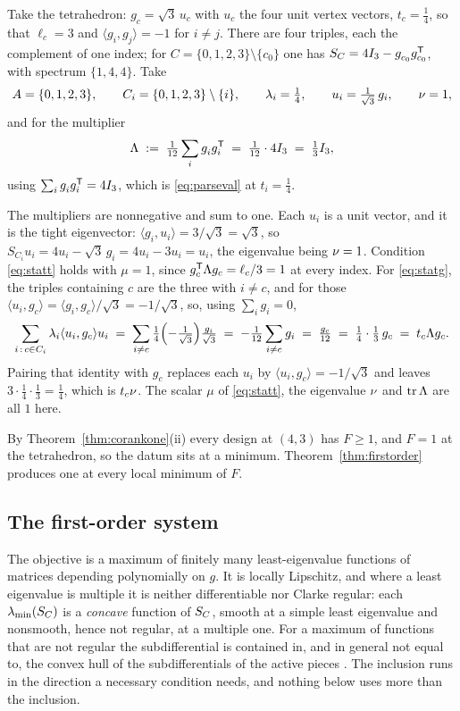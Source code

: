 \begin{example}\label{ex:tetrakkt}
Take the tetrahedron: $g_c=\sqrt3\,u_c$ with $u_c$ the four unit vertex
vectors, $t_c=\tfrac14$, so that $\ell_c=3$ and
$\langle g_i,g_j\rangle=-1$ for $i\ne j$.  There are four triples, each
the complement of one index; for $C=\{0,1,2,3\}\setminus\{c_0\}$ one has
$\SC=4I_3-g_{c_0}^{\vphantom{\mathsf{T}}}g_{c_0}\tp$, with spectrum $\{1,4,4\}$.
Take
\[
  A=\{0,1,2,3\},\qquad C_i=\{0,1,2,3\}\setminus\{i\},\qquad
  \lambda_i=\tfrac14,\qquad
  u_i=\tfrac{1}{\sqrt3}\,g_i,\qquad \nu=1 ,
\]
and for the multiplier
\[
  \Lambda\;:=\;\tfrac1{12}\sum_ig_i^{\vphantom{\mathsf{T}}}g_i\tp
  \;=\;\tfrac1{12}\cdot4I_3\;=\;\tfrac13I_3 ,
\]
using $\sum_ig_i^{\vphantom{\mathsf{T}}}g_i\tp=4I_3$, which is
\eqref{eq:parseval} at $t_i=\tfrac14$.

The multipliers are nonnegative and sum to one.  Each $u_i$ is a unit
vector, and it is the tight eigenvector:
$\langle g_i,u_i\rangle=3/\sqrt3=\sqrt3$, so
$S_{C_i}u_i=4u_i-\sqrt3\,g_i=4u_i-3u_i=u_i$, the eigenvalue being
$\nu=1$.  Condition \eqref{eq:statt} holds with $\mu=1$, since
$g_c^{\mathsf{T}}\Lambda g_c=\ell_c/3=1$ at every index.  For \eqref{eq:statg}, the
triples containing $c$ are the three with $i\ne c$, and for those
$\langle u_i,g_c\rangle=\langle g_i,g_c\rangle/\sqrt3=-1/\sqrt3$, so,
using $\sum_ig_i=0$,
\[
  \sum_{i\,:\,c\in C_i}\lambda_i\langle u_i,g_c\rangle u_i
  \;=\;\sum_{i\ne c}\tfrac14\Bigl(-\tfrac1{\sqrt3}\Bigr)
       \tfrac{g_i}{\sqrt3}
  \;=\;-\tfrac1{12}\sum_{i\ne c}g_i
  \;=\;\tfrac{g_c}{12}
  \;=\;\tfrac14\cdot\tfrac13\,g_c
  \;=\;t_c\Lambda g_c .
\]
Pairing that identity with $g_c$ replaces each $u_i$ by
$\langle u_i,g_c\rangle=-1/\sqrt3$ and leaves
$3\cdot\tfrac14\cdot\tfrac13=\tfrac14$, which is $t_c\nu$.  The scalar
$\mu$ of \eqref{eq:statt}, the eigenvalue $\nu$ and $\operatorname{tr}\Lambda$ are all
$1$ here.
\end{example}

By Theorem~\ref{thm:corankone}(ii) every design at $(4,3)$ has $F\ge1$,
and $F=1$ at the tetrahedron, so the datum sits at a minimum.
Theorem~\ref{thm:firstorder} produces one at every local minimum of $F$.

\subsection{The first-order system}\label{sec:kkt}

The objective is a maximum of finitely many least-eigenvalue functions of
matrices depending polynomially on $g$.  It is locally Lipschitz, and
where a least eigenvalue is multiple it is neither differentiable nor
Clarke regular: each $\lambda_{\min}(S_{C})$ is a \emph{concave} function of $S_{C}$,
smooth at a simple least eigenvalue and nonsmooth, hence not regular, at
a multiple one.  For a maximum of functions that are not regular the
subdifferential is contained in, and in general not equal to, the convex
hull of the subdifferentials of the active pieces
\cite[Prop.~2.3.12]{Clarke1990}.  The inclusion runs in the direction a
necessary condition needs, and nothing below uses more than the
inclusion.

